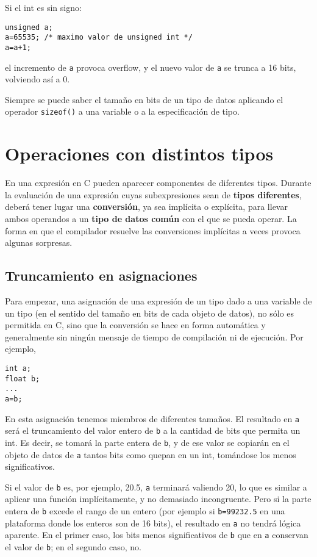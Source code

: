 Si el int es sin signo:

\begin{lstlisting}
unsigned a;
a=65535; /* maximo valor de unsigned int */
a=a+1; 
\end{lstlisting}

el incremento de \texttt{a} provoca overflow, y el nuevo valor de \texttt{a} se trunca a 16 bits, volviendo así a 0.

Siempre se puede saber el tamaño en bits de un tipo de datos aplicando el operador \texttt{sizeof()} a una
variable o a la especificación de tipo.

\section{Operaciones con distintos tipos}

En una expresión en C pueden aparecer componentes de diferentes tipos. Durante la evaluación de una
expresión cuyas subexpresiones sean de \textbf{tipos diferentes}, deberá tener lugar una \textbf{conversión}, ya sea
implícita o explícita, para llevar ambos operandos a un \textbf{tipo de datos común} con el que se pueda
operar. La forma en que el compilador resuelve las conversiones implícitas a veces provoca algunas
sorpresas.

\subsection{Truncamiento en asignaciones}

Para empezar, una asignación de una expresión de un tipo dado a una variable de un tipo  (en el sentido
del tamaño en bits de cada objeto de datos), no
sólo es permitida en C, sino que la conversión se hace en forma automática y generalmente sin ningún
mensaje de tiempo de compilación ni de ejecución. Por ejemplo,
\begin{lstlisting}
int a;
float b;
...
a=b;
\end{lstlisting}

En esta asignación tenemos miembros de diferentes tamaños. El resultado en \texttt{a} será el truncamiento
del valor entero de \texttt{b} a la cantidad de bits que permita un int. Es decir, se tomará la parte entera de \texttt{b}, y
de ese valor se copiarán en el objeto de datos de \texttt{a} tantos bits como quepan en un int, tomándose
los menos significativos.

Si el valor de \texttt{b} es, por ejemplo, 20.5, \texttt{a} terminará valiendo 20, lo que es similar a aplicar una función
 implícitamente, y no demasiado incongruente. Pero si la parte entera de \texttt{b} excede el
rango de un entero (por ejemplo si \texttt{b=99232.5} en una plataforma donde los enteros son de 16 bits), el resultado en \texttt{a} no tendrá lógica aparente. En el primer caso, los bits menos significativos de \texttt{b} que  en \texttt{a} conservan el valor de \texttt{b}; en el segundo caso, no.

